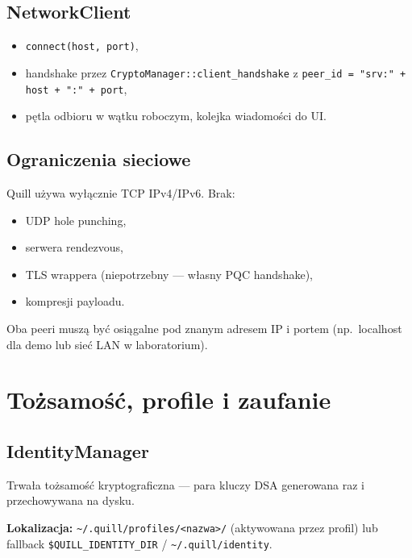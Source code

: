 \documentclass[12pt,a4paper]{article}
\begin{document}
\subsection{NetworkClient}

\begin{itemize}
    \item \texttt{connect(host, port)},
    \item handshake przez \texttt{CryptoManager::client\_handshake} z \texttt{peer\_id = "srv:" + host + ":" + port},
    \item pętla odbioru w wątku roboczym, kolejka wiadomości do UI.
\end{itemize}

\subsection{Ograniczenia sieciowe}

Quill używa wyłącznie TCP IPv4/IPv6. Brak:
\begin{itemize}
    \item UDP hole punching,
    \item serwera rendezvous,
    \item TLS wrappera (niepotrzebny --- własny PQC handshake),
    \item kompresji payloadu.
\end{itemize}

Oba peeri muszą być osiągalne pod znanym adresem IP i portem (np.\ localhost dla demo lub sieć LAN w laboratorium).

\section{Tożsamość, profile i zaufanie}

\subsection{IdentityManager}

Trwała tożsamość kryptograficzna --- para kluczy DSA generowana raz i przechowywana na dysku.

\textbf{Lokalizacja:} \texttt{\textasciitilde/.quill/profiles/<nazwa>/} (aktywowana przez profil) lub fallback \texttt{\$QUILL\_IDENTITY\_DIR} / \texttt{\textasciitilde/.quill/identity}.
\end{document}
